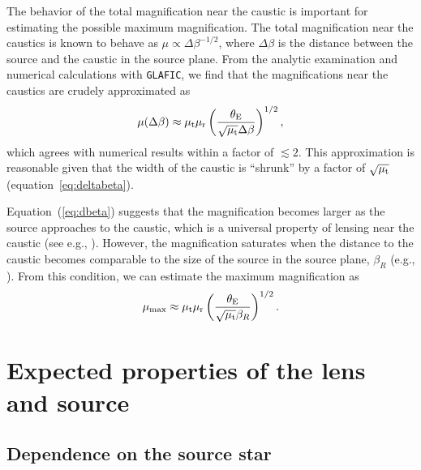 \documentclass[showpacs,twocolumn,preprintnumbers,amsmath,amssymb,superscriptaddress,nofootinbib]{revtex4}
\newcommand{\morv}[1]{#1}
\begin{document}
The behavior of the total magnification near the caustic is important
for estimating the possible maximum magnification. The total
magnification near the caustics is known to behave as $\mu\propto 
\Delta\beta^{-1/2}$, where $\Delta\beta$ is the distance between the
source and the caustic in the source plane. From the analytic
examination and numerical calculations with {\tt GLAFIC}, we find that
the magnifications near the caustics are crudely approximated as
\begin{equation}
\mu(\Delta\beta)\approx \mu_{\rm t}\mu_{\rm r}
\left(\frac{\theta_{\rm E}}{\sqrt{\mu_{\rm
      t}}\Delta\beta}\right)^{1/2},
\label{eq:dbeta}
\end{equation}
which 
\morv{agrees with numerical results within a factor of $\lesssim
  2$. This approximation}
is reasonable given that the width of the caustic is ``shrunk''
by a factor of $\sqrt{\mu_{\rm t}}$ (equation~\ref{eq:deltabeta}).

Equation~(\ref{eq:dbeta}) suggests that the magnification becomes
larger as the source approaches to the caustic, which is a universal
property of lensing near the caustic (see e.g.,
\cite{Blandford:1986zz,Schneider:1992aa}). However, the magnification
saturates when the distance to the caustic becomes comparable to the
size of the source in the source plane, $\beta_R$ (e.g.,
\cite{MiraldaEscude:1991aa}). From this condition, we can estimate the
maximum magnification as  
\begin{equation}
\mu_{\rm max}\approx \mu_{\rm t}\mu_{\rm r}
\left(\frac{\theta_{\rm E}}{\sqrt{\mu_{\rm
      t}}\beta_R}\right)^{1/2}.
\label{sec:mumax}
\end{equation}

\section{Expected properties of the lens and source}
\label{sec:expected}

\subsection{Dependence on the source star}
\end{document}
